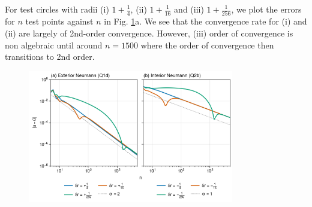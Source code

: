 \begin{enumerate}[label=(\alph*),leftmargin=*,itemsep=0mm]
    For test circles with radii (i) $1+\frac{1}{4}$, (ii) $1+\frac{1}{16}$ and (iii) $1+\frac{1}{256}$, we plot the errors for $n$ test points against $n$ in Fig. \ref{prj3_qn1dqn2b}a.  We see that the convergence rate for (i) and (ii) are largely of 2nd-order convergence.  However, (iii) order of convergence is non algebraic until around $n=1500$ where the order of convergence then transitions to 2nd order.

    \begin{figure}[h!]
    \centering
    \includegraphics[width=0.8\textwidth]{figures/prj3_qn1dqn2b.png}\\
    \caption{}
    \label{prj3_qn1dqn2b}
    \end{figure}
    
\end{enumerate}